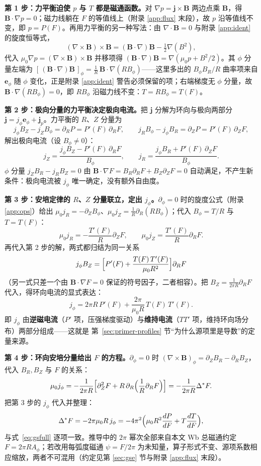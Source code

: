 \documentclass[12pt,fontset=none]{ctexart}
\numberwithin{equation}{section}
\numberwithin{table}{section}
\numberwithin{figure}{section}
\begin{document}
\textbf{第 1 步：力平衡迫使 $p$ 与 $T$ 都是磁通函数。}对 $\nabla p=\bm{j}\times\bm{B}$ 两边点乘 $\bm{B}$，得 $\bm{B}\cdot\nabla p=0$；磁力线躺在 $F$ 的等值线上（附录 \ref{app:flux} 末段），故 $p$ 沿等值线不变，即 $p=P(F)$。再用力平衡的另一种写法：由 $\nabla\cdot\bm{B}=0$ 与附录 \ref{app:ident} 的旋度恒等式，
\[
(\nabla\times\bm{B})\times\bm{B}=(\bm{B}\cdot\nabla)\bm{B}-\tfrac12\nabla(B^2),
\]
代入 $\mu_0\nabla p=(\nabla\times\bm{B})\times\bm{B}$ 并移项得 $(\bm{B}\cdot\nabla)\bm{B}=\nabla(\mu_0p+B^2/2)$。其 $\phi$ 分量左端为 $[\,(\bm{B}\cdot\nabla)\bm{B}\,]_\phi=\frac1R\,\bm{B}\cdot\nabla(RB_\phi)$——这里多出的 $B_\phi B_R/R$ 曲率项来自 $\bm{e}_\phi$ 随 $\phi$ 变化，正是附录 \ref{app:ident} 警告必须保留的项；右端梯度无 $\phi$ 分量，故 $\bm{B}\cdot\nabla(RB_\phi)=0$，即 $RB_\phi$ 沿磁力线不变：$T=RB_\phi=T(F)$。

\textbf{第 2 步：极向分量的力平衡决定极向电流。}把 $\bm{j}$ 分解为环向与极向两部分 $\bm{j}=j_\phi\bm{e}_\phi+\bm{j}_p$。力平衡的 $R$、$Z$ 分量为
\[
j_\phi B_Z-j_ZB_\phi=\partial_RP=P'(F)\,\partial_RF,\qquad
j_RB_\phi-j_\phi B_R=\partial_ZP=P'(F)\,\partial_ZF,
\]
解出极向电流（设 $B_\phi\neq0$）：
\[
j_Z=\frac{j_\phi B_Z-P'(F)\,\partial_RF}{B_\phi},\qquad
j_R=\frac{j_\phi B_R+P'(F)\,\partial_ZF}{B_\phi}.
\]
$\phi$ 分量 $j_ZB_R-j_RB_Z=0$ 由 $\bm{B}\cdot\nabla F=B_R\partial_RF+B_Z\partial_ZF=0$ 自动满足，不产生新条件：极向电流被 $j_\phi$ 唯一确定，没有额外自由度。

\textbf{第 3 步：安培定律的 $R$、$Z$ 分量联立，定出 $j_\phi$。}$\partial_\phi=0$ 时的旋度公式（附录 \ref{app:ops}）给出 $\mu_0j_R=-\partial_ZB_\phi$、$\mu_0j_Z=\frac1R\partial_R(RB_\phi)$；代入 $B_\phi=T/R$ 与 $T=T(F)$：
\[
\mu_0j_R=-\frac{T'(F)}{R}\partial_ZF,\qquad \mu_0j_Z=\frac{T'(F)}{R}\partial_RF.
\]
再代入第 2 步的解，两式都归结为同一关系
\[
j_\phi B_Z=\Bigl[P'(F)+\frac{T(F)\,T'(F)}{\mu_0R^2}\Bigr]\partial_RF
\]
（另一式只差一个由 $\bm{B}\cdot\nabla F=0$ 保证的符号因子，二者相容）。把 $B_Z=\frac{1}{2\pi R}\partial_RF$ 代入，得环向电流的显式表达：
\[
j_\phi=2\pi R\,P'(F)+\frac{2\pi}{\mu_0R}\,T(F)\,T'(F).
\]
即 $j_\phi$ 由\textbf{逆磁电流}（$P'$ 项，压强梯度驱动）与\textbf{维持电流}（$TT'$ 项，维持环向场分布）两部分组成——这就是 第~\ref{sec:primer-profiles} 节``为什么源项里是导数''的定量来源。

\textbf{第 4 步：环向安培分量给出 $F$ 的方程。}$\partial_\phi=0$ 时 $(\nabla\times\bm{B})_\phi=\partial_ZB_R-\partial_RB_Z$，代入 $B_R,B_Z$ 与 $F$ 的关系：
\[
\mu_0j_\phi=-\frac{1}{2\pi R}\Bigl[\partial_Z^2F+R\,\partial_R\Bigl(\frac1R\partial_RF\Bigr)\Bigr]=-\frac{1}{2\pi R}\Delta^*F.
\]
把第 3 步的 $j_\phi$ 代入并整理：
\[
\Delta^*F=-2\pi\mu_0R\,j_\phi=-4\pi^2\Bigl(\mu_0R^2\frac{dP}{dF}+T\frac{dT}{dF}\Bigr),
\]
与式~\eqref{eq:gsfull} 逐项一致。推导中的 $2\pi$ 幂次全部来自本文 Wb 总磁通约定 $F=2\pi RA_\phi$；若改用每弧度磁通 $\psi=F/2\pi$ 为未知量，算子形式不变、源项系数相应缩放，两者不可混用（约定见第 \ref{sec:gse} 节与附录 \ref{app:flux} 末段）。
\end{document}
